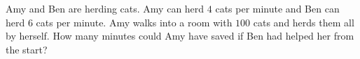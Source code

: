 Amy and Ben are herding cats. Amy can herd $4$ cats per minute and Ben can herd $6$ cats per minute. Amy walks into a room with $100$ cats and herds them all by herself. How many minutes could Amy have saved if Ben had helped her from the start?
